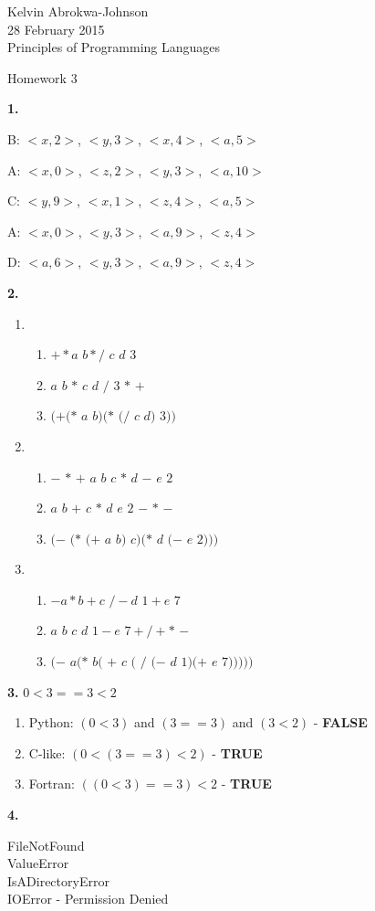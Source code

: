 \documentclass[11pt]{article} %
\begin{document}
 

Kelvin Abrokwa-Johnson \\
28 February 2015          \\
Principles of Programming Languages

\begin{center}
Homework 3
\end{center}

{\bf 1.}

B: $<x,2>$, $<y,3>$, $<x,4>$, $<a,5>$

A: $<x,0>$, $<z,2>$, $<y,3>$, $<a,10>$

C: $<y,9>$, $<x,1>$, $<z,4>$, $<a,5>$

A: $<x,0>$, $<y,3>$, $<a,9>$, $<z,4>$

D: $<a,6>$, $<y,3>$, $<a,9>$, $<z,4>$


\vskip 0.3in
{\bf 2.}

\begin{enumerate}[label=\alph*.]

\item
\begin{enumerate}
\item $ + * a$ $b * /$ $c$ $d$ $3$
\item $a$ $b$ $*$ $c$ $d$ $/$ $3$ $*$ $+$
\item $(+ (*$ $a$ $b) (*$ $(/$ $c$ $d)$ $3))$
\end{enumerate}

\item
\begin{enumerate}
\item $-$ $*$ $+$ $a$ $b$ $c$ $*$ $d$ $-$ $e$ $2$
\item $a$ $b$ $+$ $c$ $*$ $d$ $e$ $2$ $-$ $*$ $-$
\item $(-$ $(*$ $(+$ $a$ $b)$ $c) (*$ $d$ $(-$ $e$ $2)))$
\end{enumerate}

\item
\begin{enumerate}
\item $- a * b + c$ $/ - d$ $1 + e$ $7$
\item $a$ $b$ $c$ $d$ $1 - e$ $7 + / + *$ $-$
\item $(-$ $a (*$ $b ($ $+$ $c$ $($ $/$ $(-$ $d$ $1) (+$ $e$ $7)))))$
\end{enumerate}

\end{enumerate}


\vskip 0.3in
{\bf 3.} $0 < 3 == 3 < 2$

\begin{enumerate}[label=\alph*.]
\item Python: $(0 < 3)$ and $(3 == 3)$ and $(3 < 2)$ - {\bf FALSE}
\item C-like: $(0 < (3 == 3) < 2)$ - {\bf TRUE}
\item Fortran: $((0 < 3) == 3) < 2$ - {\bf TRUE}
\end{enumerate}


\vskip 0.3in
{\bf 4.}

FileNotFound \\
ValueError \\
IsADirectoryError \\
IOError - Permission Denied
\end{document}
